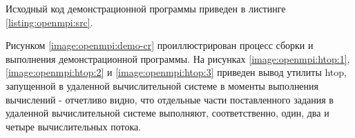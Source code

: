 Исходный код демонстрационной программы приведен в листинге \ref{listing:openmpi:src}.

Рисунком \ref{image:openmpi:demo-cr} проиллюстрирован процесс сборки и выполнения демонстрационной программы. На рисунках \ref{image:openmpi:htop:1}, \ref{image:openmpi:htop:2} и \ref{image:openmpi:htop:3} приведен вывод утилиты htop, запущенной в удаленной вычислительной системе в моменты выполнения вычислений - отчетливо видно, что отдельные части поставленного задания в удаленной вычислительной системе выполняют, соответственно, один, два и четыре вычислительных потока.


